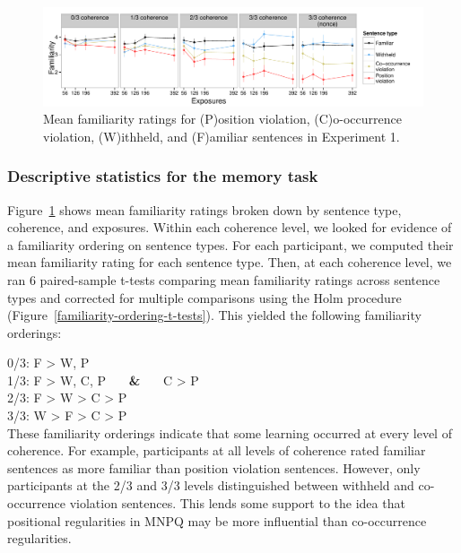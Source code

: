 \documentclass[man,floatsintext]{apa6}
\begin{document}
\begin{figure}[t]
  \begin{center}
    \includegraphics[width=1.0\linewidth]{x1-descriptive-memory} 
    \caption{Mean familiarity ratings for (P)osition violation, (C)o-occurrence violation, (W)ithheld, and (F)amiliar sentences in Experiment 1.}
    \label{x1-descriptive-mem}
  \end{center}
\end{figure}

\subsubsection{Descriptive statistics for the memory task}

Figure~\ref{x1-descriptive-mem} shows mean familiarity ratings broken down by sentence type, coherence, and exposures. Within each coherence level, we looked for evidence of a familiarity ordering on sentence types. For each participant, we computed their mean familiarity rating for each sentence type. Then, at each coherence level, we ran 6 paired-sample t-tests comparing mean familiarity ratings across sentence types and corrected for multiple comparisons using the Holm procedure (Figure~\ref{familiarity-ordering-t-tests}). This yielded the following familiarity orderings:

0/3: F > W, P\\
1/3: F > W, C, P \, \, \, \textbf{\&} \, \, \, C > P\\
2/3: F > W > C > P\\
3/3: W > F > C > P\\

\noindent These familiarity orderings indicate that some learning occurred at every level of coherence. For example, participants at all levels of coherence rated familiar sentences as more familiar than position violation sentences. However, only participants at the 2/3 and 3/3 levels distinguished between withheld and co-occurrence violation sentences. This lends some support to the idea that positional regularities in MNPQ may be more influential than co-occurrence regularities.
\end{document}
